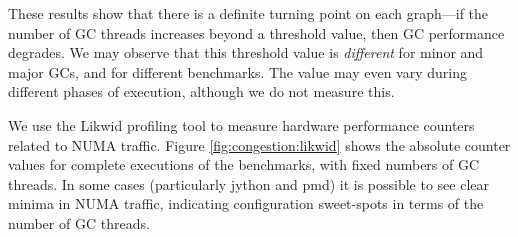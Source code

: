 These results show that there is a definite turning point on each graph---if 
the number of GC threads increases beyond a threshold value, then GC 
performance degrades. 
We may observe that this threshold value is \emph{different}
for minor and major GCs, and for different benchmarks. 
The value may even vary during different phases of execution, although
we do not measure this.

We use the Likwid \cite{treibig10likwid} profiling tool
to measure hardware performance counters related to NUMA traffic.
Figure \ref{fig:congestion:likwid} shows the absolute counter values for
complete executions of the benchmarks, with fixed numbers of
GC threads. In some cases (particularly jython and pmd) it is possible 
to see clear minima in NUMA traffic, indicating 
configuration sweet-spots in terms of the number of GC threads.